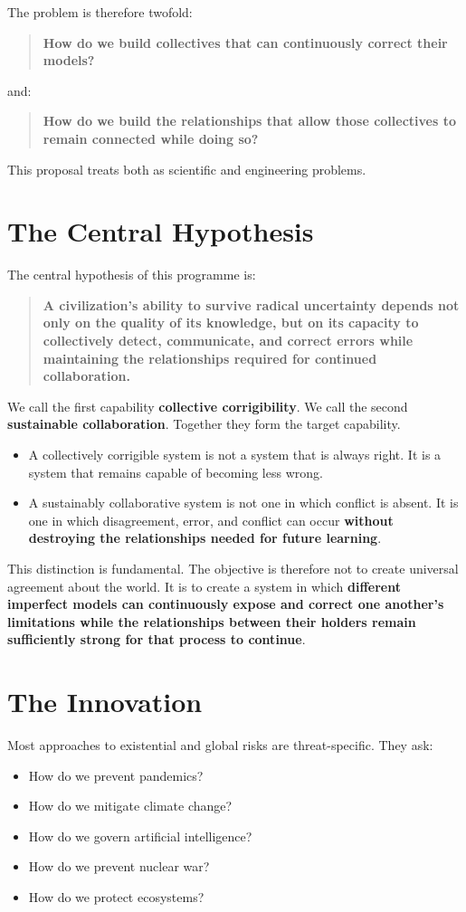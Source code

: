 \documentclass{article}
\begin{document}
The problem is therefore twofold:
\begin{quote}
    \textbf{How do we build collectives that can continuously correct their models?}
\end{quote}
and:
\begin{quote}
    \textbf{How do we build the relationships that allow those collectives to remain connected while doing so?}
\end{quote}

This proposal treats both as scientific and engineering problems.

\section{The Central Hypothesis}
The central hypothesis of this programme is:
\begin{quote}
    \textbf{A civilization's ability to survive radical uncertainty depends not only on the quality of its knowledge, but on its capacity to collectively detect, communicate, and correct errors while maintaining the relationships required for continued collaboration.}
\end{quote}

We call the first capability \textbf{collective corrigibility}. We call the second \textbf{sustainable collaboration}. Together they form the target capability.

\begin{itemize}
    \item A collectively corrigible system is not a system that is always right. It is a system that remains capable of becoming less wrong.
    \item A sustainably collaborative system is not one in which conflict is absent. It is one in which disagreement, error, and conflict can occur \textbf{without destroying the relationships needed for future learning}.
\end{itemize}

This distinction is fundamental. The objective is therefore not to create universal agreement about the world. It is to create a system in which \textbf{different imperfect models can continuously expose and correct one another's limitations while the relationships between their holders remain sufficiently strong for that process to continue}.

\section{The Innovation}
Most approaches to existential and global risks are threat-specific. They ask:
\begin{itemize}
    \item How do we prevent pandemics?
    \item How do we mitigate climate change?
    \item How do we govern artificial intelligence?
    \item How do we prevent nuclear war?
    \item How do we protect ecosystems?
\end{itemize}
\end{document}

